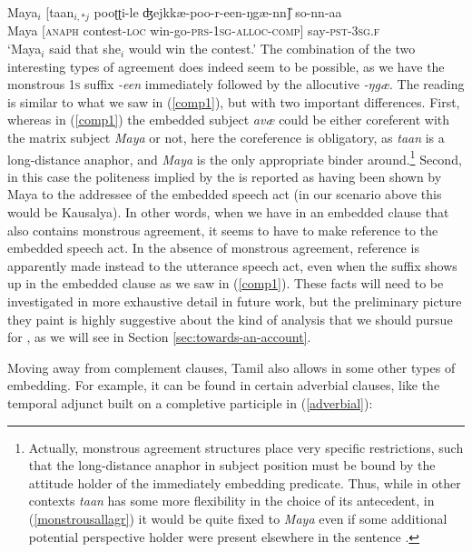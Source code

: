 \documentclass[output=paper, modfonts, nonflat]{langsci/langscibook}
\begin{document}
\ea\label{monstrousallagr}\gll Maya$_i$ [taan$_{i,*j}$ pooʈʈi-le ʤejkkæ-poo-r-een-ŋgæ-nn\U] so-nn-aa\\  
Maya [\textsc{anaph} contest-\textsc{loc}{} win-go-\textsc{prs}-1\textsc{sg}-\textsc{alloc}-\textsc{comp}] say-\textsc{pst}-3\textsc{sg.f}\\ 
\glt `Maya$_i$ said that she$_i$ would win the contest.'
\z
%
The combination of the two interesting types of agreement does indeed
seem to be possible, as we have the monstrous \textsc{1s} suffix
\textit{-een} immediately followed by the allocutive
\textit{-ŋgæ}. The reading is similar to what we saw in
(\ref{comp1}), but with two important differences. First, whereas in
(\ref{comp1}) the embedded subject \textit{avæ} could be either
coreferent with the matrix subject \textit{Maya} or not, here the
coreference is obligatory, as \textit{taan} is a long-distance
anaphor, and \textit{Maya} is the only appropriate binder
around.\footnote{Actually, monstrous agreement structures place very
  specific restrictions, such that the long-distance anaphor in
  subject position must be bound by the attitude holder of the
  immediately embedding predicate. Thus, while in other contexts
  \textit{taan} has some more flexibility in the choice of its
  antecedent, in (\ref{monstrousallagr}) it would be quite fixed to
  \textit{Maya} even if some additional potential perspective holder
  were present elsewhere in the sentence \citep[see][for
  details]{sundaresan:diss}.} Second, in this case the politeness
implied by the \allagr{} is reported as having been shown by Maya to
the addressee of the embedded speech act (in our scenario above this
would be Kausalya). In other words, when we have \allagr{} in an
embedded clause that also contains monstrous agreement, it seems to
have to make reference to the embedded speech act. In the absence of
monstrous agreement, reference is apparently made instead to the
utterance speech act, even when the suffix shows up in the embedded
clause as we saw in (\ref{comp1}). These facts will need to be
investigated in more exhaustive detail in future work, but the
preliminary picture they paint is highly suggestive about the kind of
analysis that we should pursue for \allagr, as we will see in Section
\ref{sec:towards-an-account}.

Moving away from complement clauses, Tamil also allows \allagr{} in
some other types of embedding. For example, it can be found in certain
adverbial clauses, like the temporal adjunct built on a completive
participle in (\ref{adverbial}):
\end{document}
